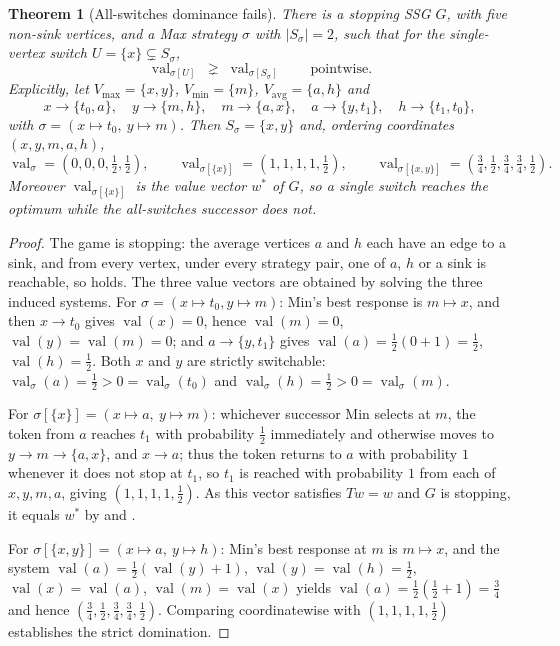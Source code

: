 \documentclass[11pt]{article}
\theoremstyle{plain}
\newtheorem{theorem}{Theorem}[section]
\theoremstyle{definition}
\DeclareMathOperator{\val}{val}
\newcommand{\Vmax}{V_{\max}}
\newcommand{\Vmin}{V_{\min}}
\newcommand{\Vavg}{V_{\mathrm{avg}}}
\begin{document}
\begin{theorem}[All-switches dominance fails]\label{thm:all-switches-refuted}
There is a stopping SSG $G$, with five non-sink vertices, and a Max
strategy $\sigma$ with $|S_\sigma|=2$, such that for the single-vertex
switch $U=\{x\}\subsetneq S_\sigma$,
\[
  \val_{\sigma[U]}\;\gneq\;\val_{\sigma[S_\sigma]} \qquad\text{pointwise.}
\]
Explicitly, let $\Vmax=\{x,y\}$, $\Vmin=\{m\}$, $\Vavg=\{a,h\}$ and
\[
  x\to\{t_0,a\},\quad y\to\{m,h\},\quad m\to\{a,x\},\quad a\to\{y,t_1\},\quad h\to\{t_1,t_0\},
\]
with $\sigma=(x\mapsto t_0,\ y\mapsto m)$. Then
$S_\sigma=\{x,y\}$ and, ordering coordinates $(x,y,m,a,h)$,
\[
  \val_\sigma=(0,0,0,\tfrac12,\tfrac12),\qquad
  \val_{\sigma[\{x\}]}=(1,1,1,1,\tfrac12),\qquad
  \val_{\sigma[\{x,y\}]}=(\tfrac34,\tfrac12,\tfrac34,\tfrac34,\tfrac12).
\]
Moreover $\val_{\sigma[\{x\}]}$ is the value vector $w^\ast$ of $G$, so a
single switch reaches the optimum while the all-switches successor does
not.
\end{theorem}

\begin{proof}
The game is stopping: the average vertices $a$ and $h$ each have an edge
to a sink, and from every vertex, under every strategy pair, one of $a$,
$h$ or a sink is reachable, so  holds. The three value
vectors are obtained by solving the three induced systems. For
$\sigma=(x\mapsto t_0, y\mapsto m)$: Min's best response is
$m\mapsto x$, and then $x\to t_0$ gives $\val(x)=0$, hence
$\val(m)=0$, $\val(y)=\val(m)=0$; and $a\to\{y,t_1\}$ gives
$\val(a)=\tfrac12(0+1)=\tfrac12$, $\val(h)=\tfrac12$. Both $x$ and $y$
are strictly switchable: $\val_\sigma(a)=\tfrac12>0=\val_\sigma(t_0)$ and
$\val_\sigma(h)=\tfrac12>0=\val_\sigma(m)$.

For $\sigma[\{x\}]=(x\mapsto a,\ y\mapsto m)$: whichever successor Min
selects at $m$, the token from $a$ reaches $t_1$ with probability
$\tfrac12$ immediately and otherwise moves to $y\to m\to\{a,x\}$, and
$x\to a$; thus the token returns to $a$ with probability $1$ whenever it
does not stop at $t_1$, so $t_1$ is reached with probability $1$ from
each of $x,y,m,a$, giving $(1,1,1,1,\tfrac12)$. As this vector satisfies
$Tw=w$ and $G$ is stopping, it equals $w^\ast$ by
 and .

For $\sigma[\{x,y\}]=(x\mapsto a,\ y\mapsto h)$: Min's best response at
$m$ is $m\mapsto x$, and the system
$\val(a)=\tfrac12(\val(y)+1)$, $\val(y)=\val(h)=\tfrac12$,
$\val(x)=\val(a)$, $\val(m)=\val(x)$ yields
$\val(a)=\tfrac12(\tfrac12+1)=\tfrac34$ and hence
$(\tfrac34,\tfrac12,\tfrac34,\tfrac34,\tfrac12)$. Comparing coordinatewise
with $(1,1,1,1,\tfrac12)$ establishes the strict domination.
\end{proof}
\end{document}
